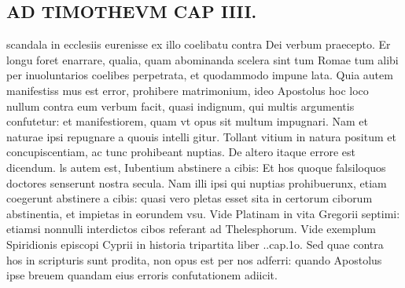 \documentclass{article}
\begin{document}
\begin{pages}
\section*{AD TIMOTHEVM CAP IIII. }
\marginpar{[ p.93 ]}\pstart scandala in ecclesiis eurenisse ex illo coelibatu contra Dei verbum praecepto. Er longu foret enarrare, qualia, quam abominanda scelera sint tum Romae tum alibi per inuoluntarios coelibes perpetrata, et quodammodo impune lata. Quia autem manifestiss mus est error, prohibere matrimonium, ideo Apostolus hoc loco nullum contra eum verbum facit, quasi indignum, qui multis argumentis confutetur: et manifestiorem, quam vt opus sit multum impugnari. Nam et naturae ipsi repugnare a quouis intelli gitur. Tollant vitium in natura positum et concupiscentiam, ac tunc prohibeant nuptias.  \pend\pstart De altero itaque errore est dicendum. ls autem est, Iubentium abstinere a cibis: Et hos quoque falsiloquos doctores senserunt nostra secula. Nam illi ipsi qui nuptias prohibuerunx, etiam coegerunt abstinere a cibis: quasi vero pletas esset sita in certorum ciborum abstinentia, et impietas in eorundem vsu. Vide Platinam in vita Gregorii septimi: etiamsi nonnulli interdictos cibos referant ad Thelesphorum. Vide exemplum Spiridionis episcopi Cyprii in historia tripartita liber ..cap.1o. Sed quae contra hos in scripturis sunt prodita, non opus est per nos adferri: quando Apostolus ipse breuem quandam eius erroris confutationem adiicit.  \pend
{}
{}

\end{pages}
\end{document}
